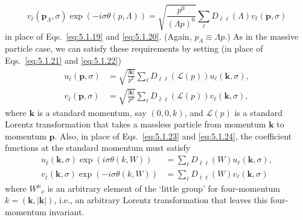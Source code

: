 \begin{equation}
v_{\bar\ell}(\mathbf p_\Lambda,\sigma)
\exp(-i\sigma\theta(p,\Lambda))=
\sqrt{\frac{p^0}{(\Lambda p)^0}}
\sum_\ell D_{\bar\ell\ell}(\Lambda)v_\ell(\mathbf p,\sigma)
\tag{5.9.7}\label{eq:5.9.7}
\end{equation}
in place of Eqs.~\eqref{eq:5.1.19} and \eqref{eq:5.1.20}. (Again,
$p_\Lambda\equiv\Lambda p$.) As in the massive particle case, we can satisfy
these requirements by setting (in place of Eqs.~\eqref{eq:5.1.21} and \eqref{eq:5.1.22})
\begin{align}
u_{\bar\ell}(\mathbf p,\sigma)&=
\sqrt{\frac{|\mathbf k|}{p^0}}\sum_\ell
D_{\bar\ell\ell}(\mathcal L(p))u_\ell(\mathbf k,\sigma),
\tag{5.9.8}\label{eq:5.9.8}\\
v_{\bar\ell}(\mathbf p,\sigma)&=
\sqrt{\frac{|\mathbf k|}{p^0}}\sum_\ell
D_{\bar\ell\ell}(\mathcal L(p))v_\ell(\mathbf k,\sigma),
\tag{5.9.9}\label{eq:5.9.9}
\end{align}
where $\mathbf k$ is a standard momentum, say $(0,0,k)$, and
$\mathcal L(p)$ is a standard Lorentz transformation that takes a massless
particle from momentum $\mathbf k$ to momentum $\mathbf p$. Also, in place of
Eqs.~\eqref{eq:5.1.23} and \eqref{eq:5.1.24}, the coefficient functions at the standard momentum
must satisfy
\begin{align}
u_{\bar\ell}(\mathbf k,\sigma)\exp(i\sigma\theta(k,W))
&=\sum_\ell D_{\bar\ell\ell}(W)u_\ell(\mathbf k,\sigma),
\tag{5.9.10}\label{eq:5.9.10}\\
v_{\bar\ell}(\mathbf k,\sigma)\exp(-i\sigma\theta(k,W))
&=\sum_\ell D_{\bar\ell\ell}(W)v_\ell(\mathbf k,\sigma)
\tag{5.9.11}\label{eq:5.9.11}
\end{align}
where $W^\mu{}_\nu$ is an arbitrary element of the `little group' for
four-momentum $k=(\mathbf k,|\mathbf k|)$, i.e., an arbitrary Lorentz
transformation that leaves this four-momentum invariant.

